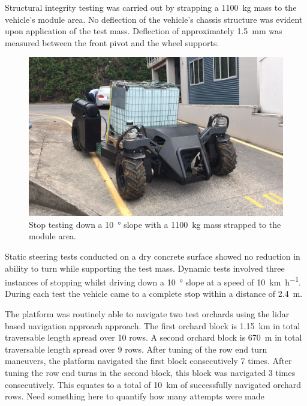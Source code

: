 \documentclass[preprint,authoryear,12pt]{elsarticle}
\begin{document}

    Structural integrity testing was carried out by strapping a \SI{1100}{\kilo\gram} mass to the vehicle's module area.
    No deflection of the vehicle's chassis structure was evident upon application of the test mass.
    Deflection of approximately \SI{1.5}{\milli\meter} was measured between the front pivot and the wheel supports.

    \begin{figure}[htb]
        \centering
        \includegraphics[width=\linewidth]{imgs/photos/stopTesting.jpg}
        \caption{
            Stop testing down a \SI{10}{\degree} slope with a \SI{1100}{\kilo\gram} mass strapped to the module area.
        }
        \label{fig:suzy_testing}
    \end{figure}

    Static steering tests conducted on a dry concrete surface showed no reduction in ability to turn while supporting the test mass.
    Dynamic tests involved three instances of stopping whilst driving down a \SI{10}{\degree} slope at a speed of \SI{10}{\kilo\meter\per\hour}.
    During each test the vehicle came to a complete stop within a distance of \SI{2.4}{\meter}.

    The platform was routinely able to navigate two test orchards using the lidar based navigation approach approach.
    The first orchard block is \SI{1.15}{\kilo\meter} in total traversable length spread over 10 rows.
    A second orchard block is \SI{670}{\meter} in total traversable length spread over 9 rows.
    After tuning of the row end turn maneuvers, the platform navigated the first block consecutively 7 times.
    After tuning the row end turns in the second block, this block was navigated 3 times consecutively.
    This equates to a total of \SI{10}{\kilo\meter} of successfully navigated orchard rows.
    \color{red}Need something here to quantify how many attempts were made\color{black}
\end{document}
